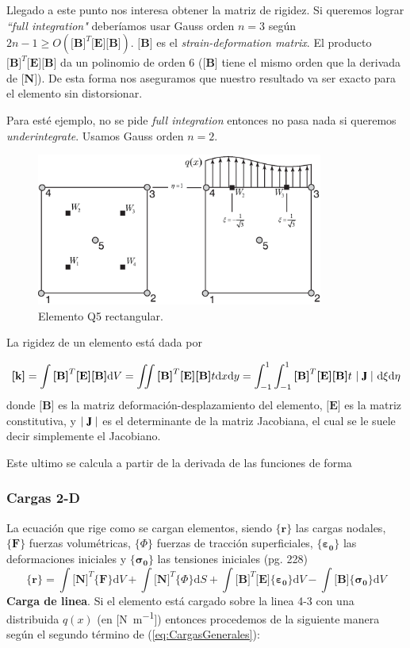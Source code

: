 \documentclass[11pt, a4paper,titlepage]{article}
\newcommand{\rmfontbf}[1]{{\fontfamily{ptm}\selectfont%
\textbf{#1}}}
\newcommand{\refp}[1]{(\ref{#1})}
\newcommand{\di}{\textrm{d}}
\newcommand{\jac}{\rmfontbf{J}}
\newcommand{\Djac}{|\;\jac\;|}
\newcommand{\sigmab}{\boldsymbol{\sigma}}
\newcommand{\varepsilonb}{\boldsymbol{\varepsilon}}
\newcommand{\CPhi}{\boldsymbol{\{ } \Phi \boldsymbol{\} }}
\newcommand{\Mme}[1]{\boldsymbol{[}\mathbf{#1} \boldsymbol{]}}
\newcommand{\Cme}[1]{\boldsymbol{\{ }\mathbf{#1} \boldsymbol{\}} }
\newcommand{\MB}{\Mme{B}}
\newcommand{\MN}{\Mme{N}}
\newcommand{\ME}{\Mme{E}}
\newcommand{\Mk}{\Mme{k}}
\begin{document}
Llegado a este punto nos interesa obtener la matriz de rigidez. Si queremos lograr \emph{``full integration"} deberíamos usar Gauss orden $n=3$ según $2n-1\geq O\left(\MB^T \ME \MB \right)$. $\MB$ es el \textit{strain-deformation matrix}. El producto $\MB^T \ME \MB$ da un polinomio de orden 6 ($\MB$ tiene el mismo orden que la derivada de $\MN$). De esta forma nos aseguramos que nuestro resultado va ser exacto para el elemento sin distorsionar.

Para esté ejemplo, no se pide \emph{full integration} entonces no pasa nada si queremos \emph{underintegrate}. Usamos Gauss orden $n=2$. 

\begin{figure}[htb!]
    \centering
    \includegraphics[height=5cm]{fig/exoticElement.eps}
    \caption{Elemento Q5 rectangular.}
    \label{fig:elemq5}
\end{figure}

La rigidez de un elemento está dada por 


\begin{equation}
    \Mk=\int \MB^T \ME \MB \di V=\iint \MB^T \ME \MB t \di x \di y=\int^1_{-1}\int^1_{-1} \MB^T \ME \MB t \ \Djac \  \di\xi  \di\eta
\end{equation}
donde $\MB$ es la matriz deformación-desplazamiento del elemento, $\ME$ es la matriz constitutiva, y $\Djac$ es el determinante de la matriz Jacobiana, el cual se le suele decir simplemente el Jacobiano.

Este ultimo se calcula a partir de la derivada de las funciones de forma $ $

\subsubsection*{Cargas 2-D}
La ecuación que rige como se cargan elementos, siendo $\Cme{r}$ las cargas nodales, $\Cme{F}$ fuerzas volumétricas, $\CPhi$ fuerzas de tracción superficiales, $\Cme{\varepsilonb_0}$ las deformaciones iniciales y $\Cme{\sigmab_0}$ las tensiones iniciales (pg. 228)
\begin{equation} \label{eq:CargasGenerales}
    \Cme{r}=\int \MN^T \Cme{F} \di V +\int \MN^T \CPhi \di S+\int \MB^T \ME \Cme{\varepsilonb_0} \di V- \int \MB \Cme{\sigmab_0} \di V
\end{equation}
\textbf{Carga de linea}. Si el elemento está cargado sobre la linea 4-3 con una distribuida $q(x)$ (en [\si{\newton \per \meter}]) entonces procedemos de la siguiente manera según el segundo término de \refp{eq:CargasGenerales}: 
\end{document}
